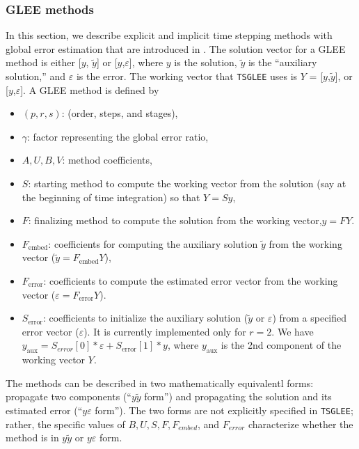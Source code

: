 \subsubsection{GLEE methods} In this section, we describe explicit and
implicit time stepping methods with global error estimation that are
introduced in \cite{Constantinescu_TR2016b}.
The solution vector for a GLEE method is either [$y$, $\tilde{y}$] or
[$y$,$\varepsilon$], where $y$ is the solution, $\tilde{y}$ is the
``auxiliary solution,'' and $\varepsilon$ is the error. The working
vector that \lstinline{TSGLEE} uses is $Y$ = [$y$,$\tilde{y}$], or
[$y$,$\varepsilon$]. A GLEE method is defined by 
\begin{itemize}
\item $(p,r,s)$: (order, steps, and stages),
\item $\gamma$: factor representing the global error ratio,
\item $A, U, B, V$: method coefficients,
\item $S$: starting method to compute the working vector from the
solution (say at the beginning of time integration) so that $Y = Sy$,
\item $F$: finalizing method to compute the solution from the working
vector,$y = FY$.
\item $F_\text{embed}$: coefficients for computing the auxiliary solution
$\tilde{y}$ from the working vector ($\tilde{y} = F_\text{embed} Y$),
\item $F_\text{error}$: coefficients to compute the estimated error vector
from the working vector ($\varepsilon = F_\text{error} Y$).
\item $S_\text{error}$: coefficients to initialize the auxiliary solution
($\tilde{y}$ or $\varepsilon$) from a specified error vector
($\varepsilon$). It is currently implemented only for $r = 2$. We have $y_\text{aux} =
S_{error}[0]*\varepsilon + S_\text{error}[1]*y$, where $y_\text{aux}$ is the 2nd
component of the working vector $Y$. 
\end{itemize}
The methods can be described in two mathematically equivalentl forms:
propagate two components (``$y\tilde{y}$ form'') and propagating the
solution and its estimated error (``$y\varepsilon$ form''). The
two forms are not explicitly specified in \lstinline{TSGLEE}; rather, the specific values
of $B, U, S, F, F_{embed}$, and $F_{error}$ characterize whether the method is
in $y\tilde{y}$ or $y\varepsilon$ form.

